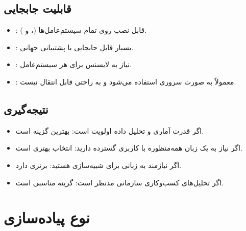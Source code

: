 \documentclass[11pt, a4paper, oneside]{book}
\begin{document}
				
			\subsection{قابلیت جابجایی}
				
				\begin{itemize}
					
					\item {\large {}}:
					{\normalsize قابل نصب روی تمام سیستم‌عامل‌ها (،  و ).}
					
					\item {\large {}}:
					{\normalsize بسیار قابل جابجایی با پشتیبانی جهانی.}
					
					\item {\large {}}:
					{\normalsize نیاز به لایسنس برای هر سیستم‌عامل.}
					
					\item {\large {}}:
					{\normalsize معمولاً به صورت سروری استفاده می‌شود و به راحتی قابل انتقال نیست.}
					
				\end{itemize}
				
			\subsection{نتیجه‌گیری}
				
				\begin{itemize}
					
					\item {\large اگر قدرت آماری و تحلیل داده اولویت است}:
					{\normalsize {} بهترین گزینه است.}
					
					\item {\large اگر نیاز به یک زبان همه‌منظوره با کاربری گسترده دارید}:
					{\normalsize {} انتخاب بهتری است.}
					
					\item {\large اگر نیازمند به زبانی برای شبیه‌سازی هستید}:
					{\normalsize {} برتری دارد.}
					
					\item {\large اگر تحلیل‌های کسب‌وکاری سازمانی مدنظر است}:
					{\normalsize {} گزینه مناسبی است.}
					
				\end{itemize}
				
		\section{نوع پیاده‌سازی}
		
\end{document}
